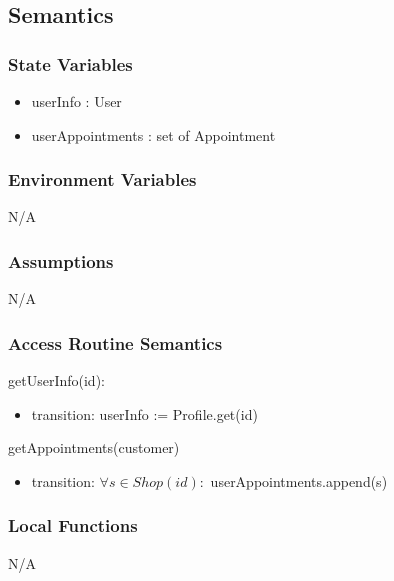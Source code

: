 \documentclass[12pt, titlepage]{article}
\begin{document}
    \subsection{Semantics}
        \subsubsection{State Variables}
            \begin{itemize}
                \item userInfo : User
                \item userAppointments : set of Appointment
            \end{itemize}
        \subsubsection{Environment Variables}
        N/A
        \subsubsection{Assumptions}
        N/A
        \subsubsection{Access Routine Semantics}
            \noindent getUserInfo(id):
            \begin{itemize}
                \item transition: userInfo := Profile.get(id)
            \end{itemize}
            \noindent getAppointments(customer)
            \begin{itemize}
                \item transition: $\forall s \in Shop(id) : $ userAppointments.append(s)
            \end{itemize}
        \subsubsection{Local Functions}
            N/A
        
\end{document}
